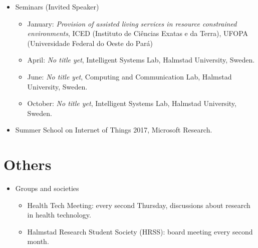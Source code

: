 \documentclass[]{article}
\begin{document}
\begin{itemize}
	\item Seminars (Invited Speaker)
		\begin{itemize}
			\item January: \textit{Provision of assisted living services in resource constrained environments}, ICED (Instituto de Ci\^{e}ncias Exatas e da Terra), UFOPA (Universidade Federal do Oeste do Par\'{a})
			\item April: \textit{No title yet}, Intelligent Systems Lab, Halmstad University, Sweden.
			\item June: \textit{No title yet}, Computing and Communication Lab, Halmstad University, Sweden.
			\item October: \textit{No title yet}, Intelligent Systems Lab, Halmstad University, Sweden.			
		\end{itemize}
	\item Summer School on Internet of Things 2017, Microsoft Research.
\end{itemize}

\section*{Others}
	\begin{itemize}
		\item Groups and societies
		\begin{itemize}
			\item Health Tech Meeting: every second Thursday, discussions about research in health technology.
			\item Halmstad Research Student Society (HRSS): board meeting every second month.
		\end{itemize}
	\end{itemize}
\end{document}
